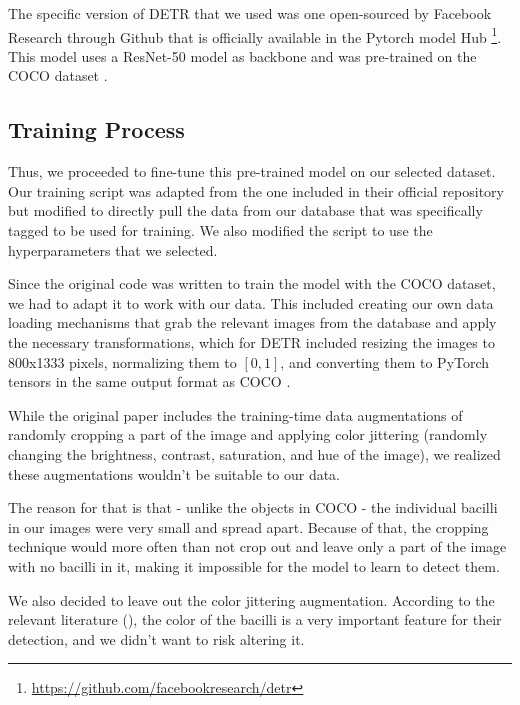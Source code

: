 \documentclass[../main.tex]{subfiles}
\begin{document}
 The specific version of DETR that we used was one open-sourced by Facebook Research through Github that is officially available in the Pytorch model Hub \footnote{\url{https://github.com/facebookresearch/detr}}. This model uses a ResNet-50 model as backbone \cite{heSpatialPyramidPooling2014} and was pre-trained on the COCO dataset \cite{linMicrosoftCOCOCommon2015}. 

\vspace{-0.4cm}
\subsection{Training Process}
 \vspace{-0.3cm}
 
 Thus, we proceeded to fine-tune this pre-trained model on our selected dataset. Our training script was adapted from the one included in their official repository but modified to directly pull the data from our database that was specifically tagged to be used for training. We also modified the script to use the hyperparameters that we selected.

 Since the original code was written to train the model with the COCO dataset, we had to adapt it to work with our data. This included creating our own data loading mechanisms that grab the relevant images from the database and apply the necessary transformations, which for DETR included resizing the images to 800x1333 pixels, normalizing them to $[0, 1]$, and converting them to PyTorch tensors in the same output format as COCO . 

 While the original paper includes the training-time data augmentations of randomly cropping a part of the image and applying color jittering (randomly changing the brightness, contrast, saturation, and hue of the image), we realized these augmentations wouldn't be suitable to our data.  
 
 The reason for that is that - unlike the objects in COCO - the individual bacilli in our images were very small and spread apart. Because of that, the cropping technique would more often than not crop out and leave only a part of the image with no bacilli in it, making it impossible for the model to learn to detect them. 
 
 We also decided to leave out the color jittering augmentation. According to the relevant literature (\cite{osman_tuberculosis_2011}), the color of the bacilli is a very important feature for their detection, and we didn't want to risk altering it.
\end{document}
